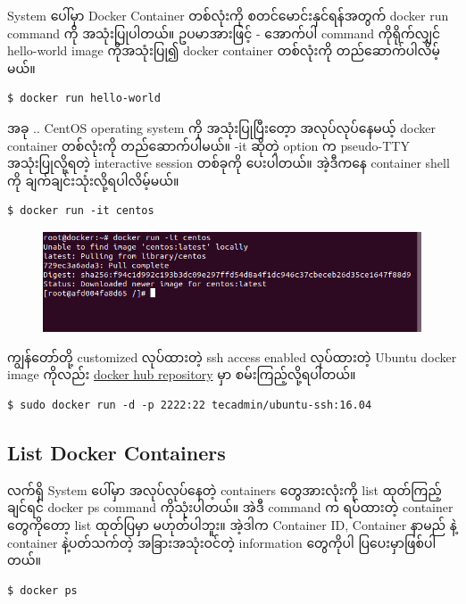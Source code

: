 System ပေါ်မှာ Docker Container တစ်လုံးကို စတင်မောင်းနှင်ရန်အတွက် docker
run command ကို အသုံးပြုပါတယ်။ ဥပမာအားဖြင့် - အောက်ပါ command
ကိုရိုက်လျှင် hello-world image ကိုအသုံးပြု၍ docker container တစ်လုံးကို
တည်ဆောက်ပါလိမ့်မယ်။

\begin{verbatim}
$ docker run hello-world
\end{verbatim}

အခု .. CentOS operating system ကို အသုံးပြုပြီးတေ့ာ အလုပ်လုပ်နေမယ့်
docker container တစ်လုံးကို တည်ဆောက်ပါမယ်။ -it ဆိုတဲ့ option က
pseudo-TTY အသုံးပြုလို့ရတဲ့ interactive session တစ်ခုကို ပေးပါတယ်။
အဲ့ဒီကနေ container shell ကို ချက်ချင်းသုံးလို့ရပါလိမ့်မယ်။

\begin{verbatim}
$ docker run -it centos
\end{verbatim}

\begin{figure}[htbp]
\centering
\includegraphics{.gitbook/assets/2_run_ti_centos.png}
\end{figure}

ကျွန်တော်တို့ customized လုပ်ထားတဲ့ ssh access enabled လုပ်ထားတဲ့ Ubuntu
docker image ကိုလည်း
\href{https://hub.docker.com/r/tecadmin/ubuntu-ssh/}{docker hub
repository} မှာ စမ်းကြည့်လို့ရပါတယ်။

\begin{verbatim}
$ sudo docker run -d -p 2222:22 tecadmin/ubuntu-ssh:16.04
\end{verbatim}

\subsection{List Docker Containers}\label{list-docker-containers}

လက်ရှိ System ပေါ်မှာ အလုပ်လုပ်နေတဲ့ containers တွေအားလုံးကို list
ထုတ်ကြည့်ချင်ရင် docker ps command ကိုသုံးပါတယ်။ အဲဒီ command က
ရပ်ထားတဲ့ container တွေကိုတော့ list ထုတ်ပြမှာ မဟုတ်ပါဘူး။ အဲ့ဒါက
Container ID, Container နာမည် နဲ့ container နဲ့ပတ်သက်တဲ့
အခြားအသုံးဝင်တဲ့ information တွေကိုပါ ပြပေးမှာဖြစ်ပါတယ်။

\begin{verbatim}
$ docker ps
\end{verbatim}

